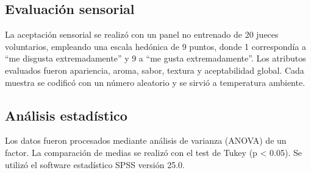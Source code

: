 \documentclass[manuscript,screen,review]{acmart}
\begin{document}
\subsection{Evaluación sensorial}
La aceptación sensorial se realizó con un panel no entrenado de 20 jueces voluntarios, empleando una escala hedónica de 9 puntos, donde 1 correspondía a “me disgusta extremadamente” y 9 a “me gusta extremadamente”. Los atributos evaluados fueron apariencia, aroma, sabor, textura y aceptabilidad global. Cada muestra se codificó con un número aleatorio y se sirvió a temperatura ambiente.

\subsection{Análisis estadístico}
Los datos fueron procesados mediante análisis de varianza (ANOVA) de un factor. La comparación de medias se realizó con el test de Tukey (p < 0.05). Se utilizó el software estadístico SPSS versión 25.0.

\makeatletter
\let\section\ACM@origsection
\let\subsection\ACM@origsubsection
\let\subsubsection\ACM@origsubsubsection
\makeatother


\end{document}
